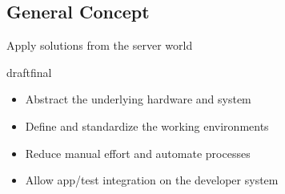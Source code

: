 \documentclass{beamer}
\def\final{final}
\def\status{draft}
\begin{document}
\subsection{General Concept}
\begin{frame}{}
  \begin{center}
    \Large Apply solutions from the server world
  \end{center}
  \vspace{.8cm}

  \ifx\status\final{}
    \pause{}
  \fi

  \begin{itemize}
    \setlength\itemsep{1.2em}
    \large
    \item Abstract the underlying hardware and system
    \item Define and standardize the working environments
    \item Reduce manual effort and automate processes
    \item Allow app/test integration on the developer system
  \end{itemize}
\end{frame}
\end{document}
